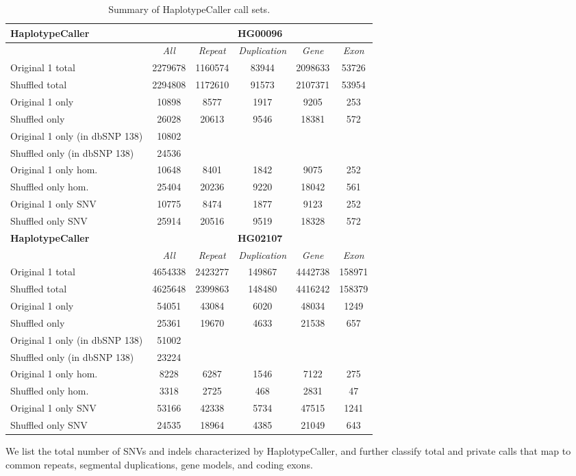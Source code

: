 \begin{table}[htb]
\caption{Summary of HaplotypeCaller call sets. }
\begin{center}
\begin{tabular}{|l|c||c|c|c|c|}
\hline
{\bf HaplotypeCaller} & \multicolumn{5}{|c|}{\bf HG00096} \\
\hline
\cline{2-6}
{\bf} & {\it All} & {\it Repeat} & {\it Duplication} & {\it Gene} & {\it Exon} \\
\hline
Original 1 total & 2279678 & 1160574 & 83944 & 2098633 & 53726\\ 
\hline
Shuffled total & 2294808 & 1172610 & 91573 & 2107371 & 53954\\ 
\hline
Original 1 only & 10898 & 8577 & 1917 & 9205 & 253\\ 
\hline
Shuffled only & 26028 & 20613 & 9546 & 18381 & 572\\ 
\hline
Original 1 only (in dbSNP 138) & 10802 &  &  &  & \\ 
\hline
Shuffled only (in dbSNP 138) & 24536 &  &  &  & \\ 
\hline
Original 1 only hom. & 10648 & 8401 & 1842 & 9075 & 252\\ 
\hline
Shuffled only hom. & 25404 & 20236 & 9220 & 18042 & 561\\ 
\hline
Original 1 only SNV & 10775 & 8474 & 1877 & 9123 & 252\\ 
\hline
Shuffled only SNV & 25914 & 20516 & 9519 & 18328 & 572\\ 
\hline
\hline
{\bf HaplotypeCaller} & \multicolumn{5}{|c|}{\bf HG02107} \\
\hline
\cline{2-6}
{\bf} & {\it All} & {\it Repeat} & {\it Duplication} & {\it Gene} & {\it Exon} \\
\hline
Original 1 total & 4654338 & 2423277 & 149867 & 4442738 & 158971\\ 
\hline
Shuffled total & 4625648 & 2399863 & 148480 & 4416242 & 158379\\ 
\hline
Original 1 only & 54051 & 43084 & 6020 & 48034 & 1249\\ 
\hline
Shuffled only & 25361 & 19670 & 4633 & 21538 & 657\\ 
\hline
Original 1 only (in dbSNP 138) & 51002 &  &  &  & \\ 
\hline
Shuffled only (in dbSNP 138) & 23224 &  &  &  & \\ 
\hline
Original 1 only hom. & 8228 & 6287 & 1546 & 7122 & 275\\ 
\hline
Shuffled only hom. & 3318 & 2725 & 468 & 2831 & 47\\ 
\hline
Original 1 only SNV & 53166 & 42338 & 5734 & 47515 & 1241\\ 
\hline
Shuffled only SNV & 24535 & 18964 & 4385 & 21049 & 643\\ 
\hline 
\end{tabular}
\end{center}
{\footnotesize We list the total number of SNVs and indels characterized by HaplotypeCaller, and further classify total and private calls that map to common repeats, segmental duplications, gene models, and coding exons.}
\label{tab:orig-vs-shuf-hc}
\end{table}



